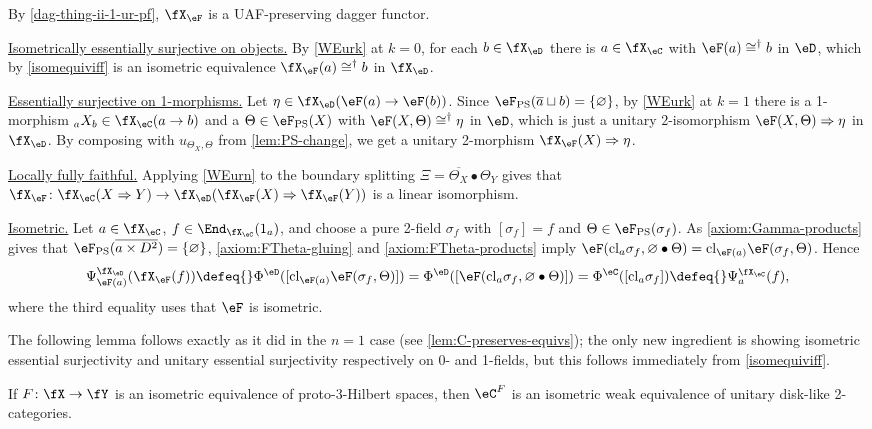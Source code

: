 \documentclass[12pt,reqno]{amsart}
\newcommand{\cl}{\mathrm{cl}}
\newcommand{\psn}{\Phi}
\newcommand{\C}{\eC}
\newcommand{\D}{\eD}
\newcommand{\blt}{\bullet}
\newcommand{\fcj}[1]{\overline{#1}}
\newcommand{\orev}{\overline}
\newcommand{\itemstep}[1]{\smallskip\noindent\underline{#1}}
\renewcommand{\amalg}{\sqcup}
\renewcommand{\star}{\dag}
\begin{document}
\begin{pf}
By \cref{dag-thing-ii-1-ur-pf}, $\fX_\eF$ is a UAF-preserving dagger functor.

\itemstep{Isometrically essentially surjective on objects.} By \ref{WEurk} at $k=0$, for each $b\in\fX_\D$ there is $a\in\fX_\C$ with $\eF(a)\cong^\star b$ in $\D$, which by \cref{isomequiviff} is an isometric equivalence $\fX_\eF(a)\cong^\dag b$ in $\fX_\D$.

\itemstep{Essentially surjective on 1-morphisms.} Let $\eta\in\fX_\D(\eF(a)\to\eF(b))$. Since $\eF_{\mathrm{PS}}(\fcj a\amalg b)=\{\varnothing\}$, by \ref{WEurk} at $k=1$ there is a 1-morphism ${}_aX_b\in\fX_\C(a\to b)$ and a $\Theta\in\eF_{\mathrm{PS}}(X)$ with $\eF(X,\Theta)\cong^\star\eta$ in $\D$, which is just a unitary $2$-isomorphism $\eF(X,\Theta)\Rightarrow\eta$ in $\fX_\D$. By composing with $u_{\Theta_X,\Theta}$ from \cref{lem:PS-change}, we get a unitary 2-morphism $\fX_\eF(X)\Rightarrow\eta$.

\itemstep{Locally fully faithful.} Applying \ref{WEurn} to the boundary splitting $\Xi=\orev{\Theta_X}\blt\Theta_Y$ gives that $\fX_\eF\colon\fX_\C(X\Rightarrow Y)\to\fX_\D(\fX_\eF(X)\Rightarrow\fX_\eF(Y))$ is a linear isomorphism.

\itemstep{Isometric.} Let $a\in\fX_\C$, $f\in\End_{\fX_\C}(1_a)$, and choose a pure 2-field $\sigma_f$ with $[\sigma_f]=f$ and $\Theta\in\eF_{\mathrm{PS}}(\sigma_f)$. As \ref{axiom:Gamma-products} gives that $\eF_{\mathrm{PS}}(\fcj{a\times D^2})=\{\varnothing\}$, \ref{axiom:FTheta-gluing} and \ref{axiom:FTheta-products} imply $\eF(\cl_{a}\sigma_f,\varnothing\blt\Theta)=\cl_{\eF(a)}\eF(\sigma_f,\Theta)$. Hence
\[
\Psi^{\fX_\D}_{\eF(a)}(\fX_\eF(f))
\defeq{}\psn^\D([\cl_{\eF(a)}\eF(\sigma_f,\Theta)])
=\psn^\D([\eF(\cl_{a}\sigma_f,\varnothing\blt\Theta)])
=\psn^\C([\cl_{a}\sigma_f])
\defeq{}\Psi^{\fX_\C}_a(f),
\]
where the third equality uses that $\eF$ is isometric.
\end{pf}

The following lemma follows exactly as it did in the $n=1$ case (see \cref{lem:C-preserves-equivs}); the only new ingredient is showing isometric essential surjectivity and unitary essential surjectivity respectively on 0- and 1-fields, but this follows immediately from \cref{isomequiviff}.

\begin{lemma}
\label{2lem:C-preserves-equivs}
If $F\colon\fX\to\fY$ is an isometric equivalence of proto-3-Hilbert spaces, then $\C^F$ is an isometric weak equivalence of unitary disk-like 2-categories.
\end{lemma}
\end{document}

